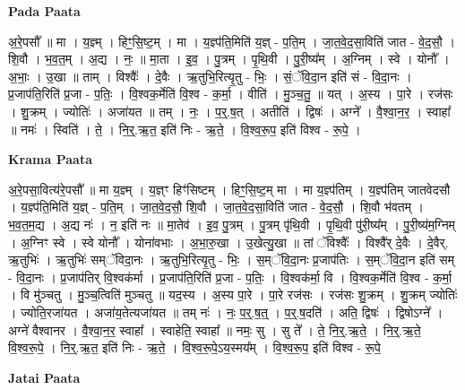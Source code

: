 \documentclass[17pt]{extarticle}
\begin{document}
\textbf{Pada Paata} \newline

अ॒रे॒पसौ᳚ ॥ मा । य॒ज्ञ्म् । हिꣳ॒॒सि॒ष्ट॒म् । मा । य॒ज्ञ्प॑ति॒मिति॑ य॒ज्ञ् - प॒ति॒म् । जा॒त॒वे॒द॒सा॒विति॑ जात - वे॒द॒सौ॒ । शि॒वौ । भ॒व॒त॒म् । अ॒द्य । नः॒ ॥ मा॒ता । इ॒व॒ । पु॒त्रम् । पृ॒थि॒वी । पु॒री॒ष्य᳚म् । अ॒ग्निम् । स्वे । योनौ᳚ । अ॒भाः॒ । उ॒खा ॥ ताम् । विश्वैः᳚ । दे॒वैः । ऋ॒तुभि॒रित्यृ॒तु - भिः॒ । सं॒ॅवि॒दा॒न इति॑ सं - वि॒दा॒नः । प्र॒जाप॑ति॒रिति॑ प्र॒जा - प॒तिः॒ । वि॒श्वक॒र्मेति॑ वि॒श्व - क॒र्मा॒ । वीति॑ । मु॒ञ्च॒तु॒ ॥ यत् । अ॒स्य । पा॒रे । रज॑सः । शु॒क्रम् । ज्योतिः॑ । अजा॑यत ॥ तम् । नः॒ । प॒र्॒.ष॒त् । अतीति॑ । द्विषः॑ । अग्ने᳚ । वै॒श्वा॒न॒र॒ । स्वाहा᳚ ॥ नमः॑ । स्विति॑ । ते॒ । नि॒र्॒.ऋ॒त॒ इति॑ निः - ऋ॒ते॒ । वि॒श्व॒रू॒प॒ इति॑ विश्व - रू॒पे॒ ।  \newline


\textbf{Krama Paata} \newline

अ॒रे॒पसा॒वित्य॑रे॒पसौ᳚ ॥ मा य॒ज्ञ्म् । य॒ज्ञ्ꣳ हिꣳ॑सिष्टम् । हिꣳ॒॒सि॒ष्ट॒म् मा । मा य॒ज्ञ्प॑तिम् । य॒ज्ञ्प॑तिम् जातवेदसौ । य॒ज्ञ्प॑ति॒मिति॑ य॒ज्ञ् - प॒ति॒म् । जा॒त॒वे॒द॒सौ॒ शि॒वौ । जा॒त॒वे॒द॒सा॒विति॑ जात - वे॒द॒सौ॒ । शि॒वौ भ॑वतम् । भ॒व॒त॒म॒द्य । अ॒द्य नः॑ । न॒ इति॑ नः ॥ मा॒तेव॑ । इ॒व॒ पु॒त्रम् । पु॒त्रम् पृ॑थि॒वी । पृ॒थि॒वी पु॑री॒ष्य᳚म् । पु॒री॒ष्य॑म॒ग्निम् । अ॒ग्निꣳ स्वे । स्वे योनौ᳚ । योना॑वभाः । अ॒भा॒रु॒खा । उ॒खेत्यु॒खा ॥ तां ॅविश्वैः᳚ । विश्वै᳚र् दे॒वैः । दे॒वैर्. ऋ॒तुभिः॑ । ऋ॒तुभिः॑ सम्ॅविदा॒नः । ऋ॒तुभि॒रित्यृ॒तु - भिः॒ । स॒म्ॅवि॒दा॒नः प्र॒जाप॑तिः । स॒म्ॅवि॒दा॒न इति॑ सम् - वि॒दा॒नः । प्र॒जाप॑तिर् वि॒श्वक॑र्मा । प्र॒जाप॑ति॒रिति॑ प्र॒जा - प॒तिः॒ । वि॒श्वक॑र्मा॒ वि । वि॒श्वक॒र्मेति॑ वि॒श्व - क॒र्मा॒ । वि मु॑ञ्चतु । मु॒ञ्च॒त्विति॑ मुञ्चतु ॥ यद॒स्य । अ॒स्य पा॒रे । पा॒रे रज॑सः । रज॑सः शु॒क्रम् । शु॒क्रम् ज्योतिः॑ । ज्योति॒रजा॑यत । अजा॑य॒तेत्यजा॑यत ॥ तम् नः॑ । नः॒ प॒र्॒.ष॒त्॒ । प॒र्॒.ष॒दति॑ । अति॒ द्विषः॑ । द्विषोऽग्ने᳚ । अग्ने॑ वैश्वानर । वै॒श्वा॒न॒र॒ स्वाहा᳚ । स्वाहेति॒ स्वाहा᳚ ॥ नमः॒ सु । सु ते᳚ । ते॒ नि॒र्॒.ऋ॒ते॒ । नि॒र्॒.ऋ॒ते॒ वि॒श्व॒रू॒पे॒ । नि॒र्॒.ऋ॒त॒ इति॑ निः - ऋ॒ते॒ । वि॒श्व॒रू॒पे॒ऽय॒स्मय᳚म् । वि॒श्व॒रू॒प॒ इति॑ विश्व - रू॒पे॒ \newline

\textbf{Jatai Paata} \newline
\end{document}

